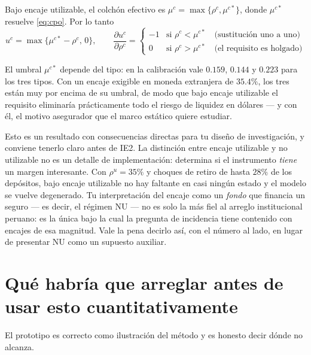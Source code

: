 Bajo encaje utilizable, el colchón efectivo es $\mu^c = \max\{\rho^c, \mu^{c*}\}$,
donde $\mu^{c*}$ resuelve \eqref{eq:cpo}. Por lo tanto
\begin{equation}
u^c = \max\{\mu^{c*}-\rho^c,\,0\},
\qquad
\frac{\partial u^c}{\partial \rho^c} =
\begin{cases}
-1 & \text{si } \rho^c < \mu^{c*} \quad\text{(sustitución uno a uno)}\\
0 & \text{si } \rho^c > \mu^{c*} \quad\text{(el requisito es holgado)}
\end{cases}
\end{equation}

El umbral $\mu^{c*}$ depende del tipo: en la calibración vale $0.159$, $0.144$ y
$0.223$ para los tres tipos. Con un encaje exigible en moneda extranjera de
$35.4\%$, los tres están muy por encima de su umbral, de modo que bajo encaje
utilizable el requisito eliminaría prácticamente todo el riesgo de liquidez en
dólares --- y con él, el motivo asegurador que el marco estático quiere estudiar.

\begin{tutesis}
Esto es un resultado con consecuencias directas para tu diseño de investigación,
y conviene tenerlo claro antes de IE2. La distinción entre encaje utilizable y
no utilizable no es un detalle de implementación: determina si el instrumento
\emph{tiene} un margen interesante. Con $\rho^u=35\%$ y choques de retiro de
hasta $28\%$ de los depósitos, bajo encaje utilizable no hay faltante en casi
ningún estado y el modelo se vuelve degenerado. Tu interpretación del encaje
como un \emph{fondo} que financia un seguro --- es decir, el régimen NU --- no es
solo la más fiel al arreglo institucional peruano: es la única bajo la cual la
pregunta de incidencia tiene contenido con encajes de esa magnitud. Vale la pena
decirlo así, con el número al lado, en lugar de presentar NU como un supuesto
auxiliar.
\end{tutesis}

\section{Qué habría que arreglar antes de usar esto cuantitativamente}
\label{sec:limitaciones-prototipo}

El prototipo es correcto como ilustración del método y es honesto decir dónde no
alcanza.

